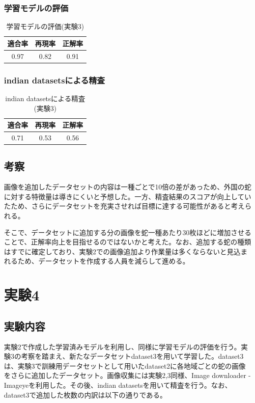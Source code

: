 \documentclass[a4paper, 11pt, titlepage]{jsarticle}
\begin{document}
\subsubsection{学習モデルの評価}
\begin{table}[htb]
\centering
  \caption{学習モデルの評価(実験3)}
  \begin{tabular}{|c|c|c|}  \hline
    適合率 & 再現率 & 正解率 \\ \hline
    0.97 & 0.82 & 0.91 \\ \hline
  \end{tabular}
\end{table}

\subsubsection{indian datasetsによる精査}
\begin{table}[htb]
\centering
  \caption{indian datasetsによる精査(実験3)}
  \begin{tabular}{|c|c|c|}  \hline
    適合率 & 再現率 & 正解率 \\ \hline
    0.71 & 0.53 & 0.56 \\ \hline
  \end{tabular}
\end{table}

\subsection{考察}
画像を追加したデータセットの内容は一種ごとで10倍の差があっため、外国の蛇に対する特徴量は導きにくいと予想した。一方、精査結果のスコアが向上していたため、さらにデータセットを充実させれば目標に達する可能性があると考えられる。\par
そこで、データセットに追加する分の画像を蛇一種あたり30枚ほどに増加させることで、正解率向上を目指せるのではないかと考えた。なお、追加する蛇の種類はすでに確定しており、実験2での画像追加より作業量は多くならないと見込まれるため、データセットを作成する人員を減らして進める。\par

\section{実験4}
\subsection{実験内容}
実験2で作成した学習済みモデルを利用し、同様に学習モデルの評価を行う。実験3の考察を踏まえ、新たなデータセットdataset3を用いて学習した。dataset3は、実験3で訓練用データセットとして用いたdataset2に各地域ごとの蛇の画像をさらに追加したデータセット。画像収集には実験2,3同様、Image downloader - Imageyeを利用した。その後、indian datasetsを用いて精査を行う。なお、dataset3で追加した枚数の内訳は以下の通りである。\par
\end{document}
